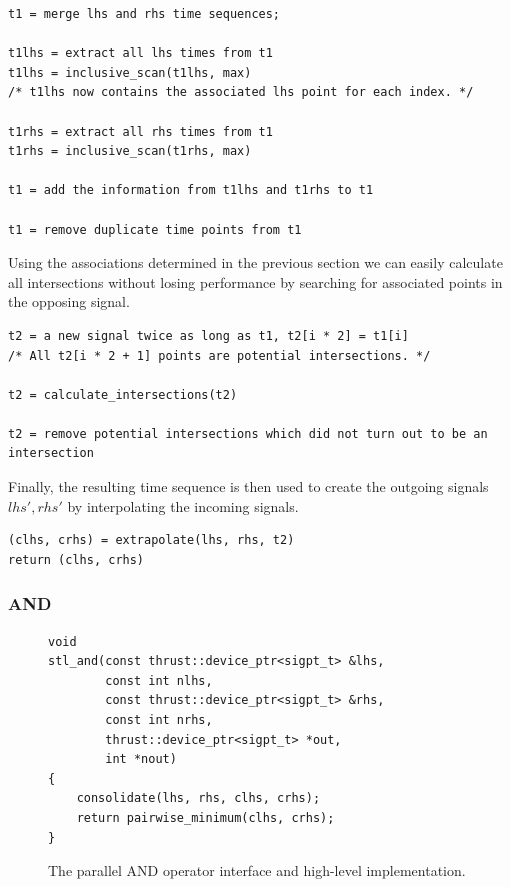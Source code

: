 \documentclass[a4paper,10pt]{article}
\begin{document}
\begin{lstlisting}
t1 = merge lhs and rhs time sequences;

t1lhs = extract all lhs times from t1
t1lhs = inclusive_scan(t1lhs, max)
/* t1lhs now contains the associated lhs point for each index. */

t1rhs = extract all rhs times from t1
t1rhs = inclusive_scan(t1rhs, max)

t1 = add the information from t1lhs and t1rhs to t1

t1 = remove duplicate time points from t1
\end{lstlisting}

Using the associations determined in the previous section we can easily calculate
all intersections without losing performance by searching for associated points
in the opposing signal.

\begin{lstlisting}
t2 = a new signal twice as long as t1, t2[i * 2] = t1[i]
/* All t2[i * 2 + 1] points are potential intersections. */

t2 = calculate_intersections(t2)

t2 = remove potential intersections which did not turn out to be an intersection
\end{lstlisting}

Finally, the resulting time sequence is then used to create the outgoing signals
$lhs', rhs'$ by interpolating the incoming signals.

\begin{lstlisting}
(clhs, crhs) = extrapolate(lhs, rhs, t2)
return (clhs, crhs)
\end{lstlisting}

\subsubsection{AND}

\begin{figure}[H]
\begin{lstlisting}
void
stl_and(const thrust::device_ptr<sigpt_t> &lhs,
        const int nlhs,
        const thrust::device_ptr<sigpt_t> &rhs,
        const int nrhs,
        thrust::device_ptr<sigpt_t> *out,
        int *nout)
{
	consolidate(lhs, rhs, clhs, crhs);
	return pairwise_minimum(clhs, crhs);
}
\end{lstlisting}
\caption{
\label{fig:parallel_and}
The parallel AND operator interface and high-level implementation.}
\end{figure}
\end{document}
